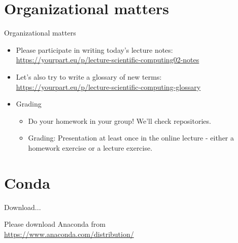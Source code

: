 
\subtitle{Installation of Python using Conda and first steps in Python}
\date{2020-03-26}


\begin{frame}
	\tableofcontents
\end{frame}


\section{Organizational matters}
\begin{frame}[fragile]{Organizational matters}

	\begin{itemize}
		\item Please participate in writing today's lecture notes:
            \href{https://yourpart.eu/p/lecture-scientific-computing02-notes}{https://yourpart.eu/p/lecture-scientific-computing02-notes}\pause
        \item Let's also try to write a glossary of new terms:\\
            \href{https://yourpart.eu/p/lecture-scientific-computing-glossary}{https://yourpart.eu/p/lecture-scientific-computing-glossary}
		\item Grading
			\begin{itemize}
				\item Do your homework in your group! We'll check repositories.
				\item Grading: Presentation at least once in the online lecture - either a homework exercise or a lecture exercise.
			\end{itemize}
	\end{itemize}
\end{frame}

\section{Conda}
\begin{frame}{Download...}

	Please download Anaconda from\\
	\href{https://www.anaconda.com/distribution/}{https://www.anaconda.com/distribution/}\\

\end{frame}

